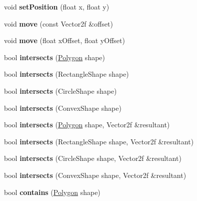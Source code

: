 \begin{DoxyCompactItemize}
void {\bfseries set\+Position} (float x, float y)
\item 
\mbox{\label{class_polygon_a21dc29d3c6dfa6d59a4f62dc0b135e50}} 
void {\bfseries move} (const Vector2f \&offset)
\item 
\mbox{\label{class_polygon_ab809ff31ab4a7ec2ebe6e5b3ef2217c5}} 
void {\bfseries move} (float x\+Offset, float y\+Offset)
\item 
\mbox{\label{class_polygon_a15574e83f243b648b0d70537b41118ae}} 
bool {\bfseries intersects} (\mbox{\hyperlink{class_polygon}{Polygon}} shape)
\item 
\mbox{\label{class_polygon_ad4a0ce3f20094604b01dd96d06257ea1}} 
bool {\bfseries intersects} (Rectangle\+Shape shape)
\item 
\mbox{\label{class_polygon_ad9ce9cb3c6871e75099a261a810bedcc}} 
bool {\bfseries intersects} (Circle\+Shape shape)
\item 
\mbox{\label{class_polygon_a24df2b2ee889cdd07ea91ccaa4810a93}} 
bool {\bfseries intersects} (Convex\+Shape shape)
\item 
\mbox{\label{class_polygon_a713983b426b75523599e862924bca782}} 
bool {\bfseries intersects} (\mbox{\hyperlink{class_polygon}{Polygon}} shape, Vector2f \&resultant)
\item 
\mbox{\label{class_polygon_aa1af5f5482999785aed533d16279c67b}} 
bool {\bfseries intersects} (Rectangle\+Shape shape, Vector2f \&resultant)
\item 
\mbox{\label{class_polygon_a874be1c28a2a1477d1ea5d85ece74822}} 
bool {\bfseries intersects} (Circle\+Shape shape, Vector2f \&resultant)
\item 
\mbox{\label{class_polygon_ab7fb23f4dbf6277688c4fb11f0a5938f}} 
bool {\bfseries intersects} (Convex\+Shape shape, Vector2f \&resultant)
\item 
\mbox{\label{class_polygon_a1501a824c6d97ce3ef8efc5443ab1f8e}} 
bool {\bfseries contains} (\mbox{\hyperlink{class_polygon}{Polygon}} shape)

\end{DoxyCompactItemize}
